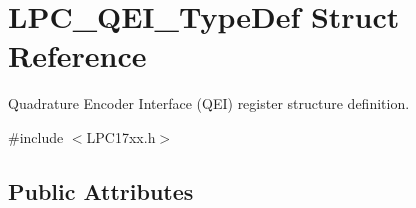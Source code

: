 \hypertarget{struct_l_p_c___q_e_i___type_def}{\section{\-L\-P\-C\-\_\-\-Q\-E\-I\-\_\-\-Type\-Def \-Struct \-Reference}
\label{struct_l_p_c___q_e_i___type_def}
}


\-Quadrature \-Encoder \-Interface (\-Q\-E\-I) register structure definition.  




{\ttfamily \#include $<$\-L\-P\-C17xx.\-h$>$}

\subsection*{\-Public \-Attributes}
